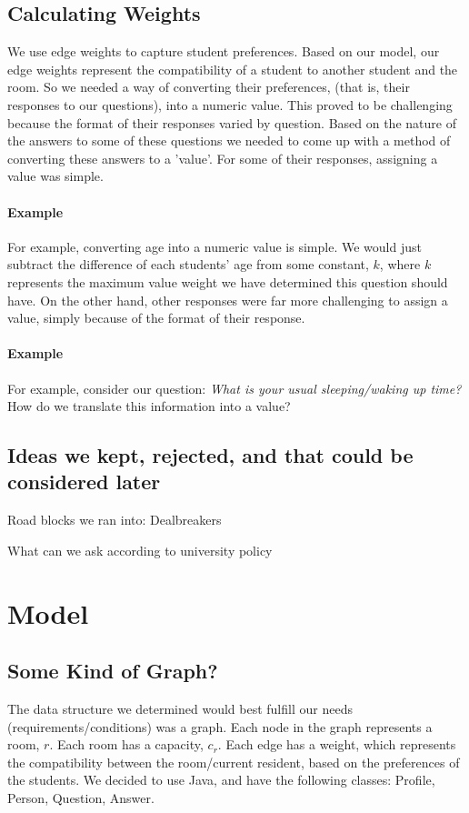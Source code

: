 \documentclass[12pt]{article}
\begin{document}
\begin{multicols}{2}
\subsection{Calculating Weights}
We use edge weights to capture student preferences.
Based on our model, our edge weights represent the compatibility of a student to another student and the room. So we needed a way of converting their preferences, (that is, their responses to our questions), into a numeric value. 
This proved to be challenging because the format of their responses varied by question. Based on the nature of the answers to some of these questions we needed to come up with a method of converting these answers to a 'value'. For some of their responses, assigning a value was simple.
\paragraph{Example}
For example, converting age into a numeric value is simple. We would just subtract the difference of each students' age from some constant, $k$, where $k$ represents the maximum value weight we have determined this question should have. On the other hand, other responses were far more challenging to assign a value, simply because of the format of their response. 

\paragraph{Example}
For example, consider our question: \textit{What is your usual sleeping/waking up time?} How do we translate this information into a value? 

\subsection{Ideas we kept, rejected, and that could be considered later}
Road blocks we ran into:
Dealbreakers

What can we ask according to university policy
\end{multicols} %
\section{Model}

\subsection{Some Kind of Graph?}
The data structure we determined would best fulfill our needs (requirements/conditions) was a graph. Each node in the graph represents a room, $r$. Each room has a capacity, $c_r$. Each edge has a weight, which represents the compatibility between the room/current resident, based on the preferences of the students. We decided to use Java, and have the following classes: Profile, Person, Question, Answer.
\end{document}
